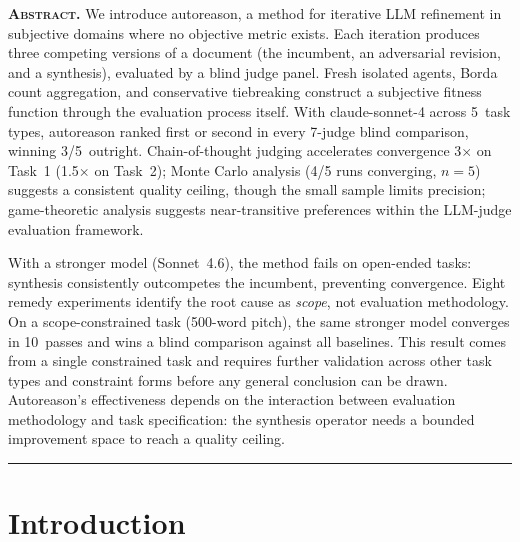 \documentclass[10pt,twocolumn]{article}
\begin{document}

\noindent\textbf{\scshape Abstract.}\enspace
We introduce autoreason, a method for iterative LLM refinement in subjective domains where no objective metric exists. Each iteration produces three competing versions of a document (the incumbent, an adversarial revision, and a synthesis), evaluated by a blind judge panel. Fresh isolated agents, Borda count aggregation, and conservative tiebreaking construct a subjective fitness function through the evaluation process itself. With claude-sonnet-4 across 5~task types, autoreason ranked first or second in every 7-judge blind comparison, winning 3/5~outright. Chain-of-thought judging accelerates convergence 3$\times$ on Task~1 (1.5$\times$ on Task~2); Monte Carlo analysis (4/5 runs converging, $n{=}5$) suggests a consistent quality ceiling, though the small sample limits precision; game-theoretic analysis suggests near-transitive preferences within the LLM-judge evaluation framework.

With a stronger model (Sonnet~4.6), the method fails on open-ended tasks: synthesis consistently outcompetes the incumbent, preventing convergence. Eight remedy experiments identify the root cause as \textit{scope}, not evaluation methodology. On a scope-constrained task (500-word pitch), the same stronger model converges in 10~passes and wins a blind comparison against all baselines. This result comes from a single constrained task and requires further validation across other task types and constraint forms before any general conclusion can be drawn. Autoreason's effectiveness depends on the interaction between evaluation methodology and task specification: the synthesis operator needs a bounded improvement space to reach a quality ceiling.

\vspace{6pt}
\hrule
\vspace{6pt}

\section{Introduction}
\end{document}
